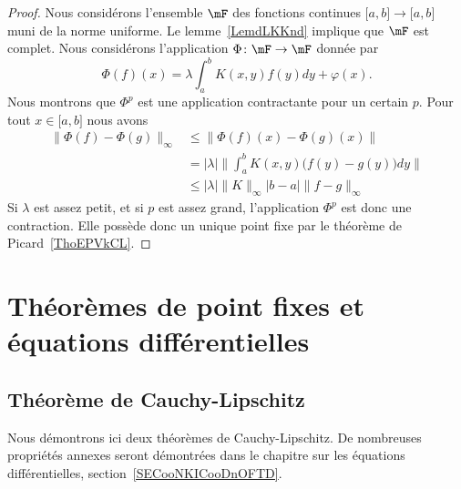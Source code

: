 \begin{proof}
    Nous considérons l'ensemble \( \mF\) des fonctions continues \( \mathopen[ a , b \mathclose]\to\mathopen[ a , b \mathclose]\) muni de la norme uniforme. Le lemme~\ref{LemdLKKnd} implique que \( \mF\) est complet. Nous considérons l'application \( \Phi\colon \mF\to \mF\) donnée par
    \begin{equation}
        \Phi(f)(x)=\lambda\int_a^bK(x,y)f(y)dy+\varphi(x).
    \end{equation}
    Nous montrons que \( \Phi^p\) est une application contractante pour un certain \( p\). Pour tout \( x\in \mathopen[ a , b \mathclose]\) nous avons
    \begin{subequations}
        \begin{align}
            \| \Phi(f)-\Phi(g) \|_{\infty}&\leq \| \Phi(f)(x)-\Phi(g)(x) \|\\
            &=| \lambda |\Big\| \int_a^bK(x,y)\big( f(y)-g(y) \big)dy  \Big\|\\
            &\leq | \lambda |\| K \|_{\infty}| b-a |\| f-g \|_{\infty}
        \end{align}
    \end{subequations}
    Si \( \lambda\) est assez petit, et si \( p\) est assez grand, l'application \( \Phi^p\) est donc une contraction. Elle possède donc un unique point fixe par le théorème de Picard~\ref{ThoEPVkCL}.
\end{proof}

\section{Théorèmes de point fixes et équations différentielles}

\subsection{Théorème de Cauchy-Lipschitz}

Nous démontrons ici deux théorèmes de Cauchy-Lipschitz. De nombreuses propriétés annexes seront démontrées dans le chapitre sur les équations différentielles, section~\ref{SECooNKICooDnOFTD}.

